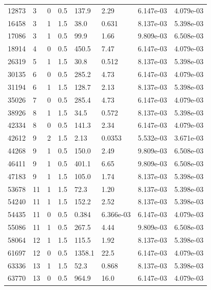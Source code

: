 \documentclass[preview]{standalone}
\begin{document}
{{\begin{tabular}{L{1.2cm}C{1.2cm} C{0.3cm}C{0.5cm} C{1.4cm}C{1.4cm} C{1.4cm}C{1.4cm}}
  12873  &     3  & 0     & 0.5 &  137.9  & 2.29  & 6.147e-03 &  4.079e-03   \\ 
  16458  &     3  & 1     & 1.5 &  38.0  & 0.631  & 8.137e-03 &  5.398e-03   \\ 
  17086  &     3  & 1     & 0.5 &  99.9  & 1.66  & 9.809e-03 &  6.508e-03   \\ 
  18914  &     4  & 0     & 0.5 &  450.5  & 7.47  & 6.147e-03 &  4.079e-03   \\ 
  26319  &     5  & 1     & 1.5 &  30.8  & 0.512  & 8.137e-03 &  5.398e-03   \\ 
  30135  &     6  & 0     & 0.5 &  285.2  & 4.73  & 6.147e-03 &  4.079e-03   \\ 
  31194  &     6  & 1     & 1.5 &  128.7  & 2.13  & 8.137e-03 &  5.398e-03   \\ 
  35026  &     7  & 0     & 0.5 &  285.4  & 4.73  & 6.147e-03 &  4.079e-03   \\ 
  38926  &     8  & 1     & 1.5 &  34.5  & 0.572  & 8.137e-03 &  5.398e-03   \\ 
  42334  &     8  & 0     & 0.5 &  141.3  & 2.34  & 6.147e-03 &  4.079e-03   \\ 
  42612  &     9  & 2     & 1.5 &  2.13  & 0.0353  & 5.532e-03 &  3.671e-03   \\ 
  44268  &     9  & 1     & 0.5 &  150.0  & 2.49  & 9.809e-03 &  6.508e-03   \\ 
  46411  &     9  & 1     & 0.5 &  401.1  & 6.65  & 9.809e-03 &  6.508e-03   \\ 
  47183  &     9  & 1     & 1.5 &  105.0  & 1.74  & 8.137e-03 &  5.398e-03   \\ 
  53678  &    11  & 1     & 1.5 &  72.3  & 1.20  & 8.137e-03 &  5.398e-03   \\ 
  54240  &    11  & 1     & 1.5 &  152.2  & 2.52  & 8.137e-03 &  5.398e-03   \\ 
  54435  &    11  & 0     & 0.5 &  0.384  & 6.366e-03  & 6.147e-03 &  4.079e-03   \\ 
  55086  &    11  & 1     & 0.5 &  267.5  & 4.44  & 9.809e-03 &  6.508e-03   \\ 
  58064  &    12  & 1     & 1.5 &  115.5  & 1.92  & 8.137e-03 &  5.398e-03   \\ 
  61697  &    12  & 0     & 0.5 &  1358.1  & 22.5  & 6.147e-03 &  4.079e-03   \\ 
  63336  &    13  & 1     & 1.5 &  52.3  & 0.868  & 8.137e-03 &  5.398e-03   \\ 
  63770  &    13  & 0     & 0.5 &  964.9  & 16.0  & 6.147e-03 &  4.079e-03   \\ 

\end{tabular}}}
\end{document}
